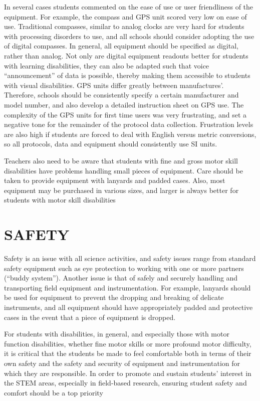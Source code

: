 \documentclass[11.5pt]{sig-alternate} %
\begin{document}
\begin{large}
In several cases students commented on the ease of use or user friendliness of the equipment. For example, the compass and GPS unit scored very low on ease of use. Traditional compasses, similar to analog clocks are very hard for students with processing disorders to use, and all schools should consider adopting the use of digital compasses. In general, all equipment should be specified as digital, rather than analog. Not only are digital equipment readouts better for students with learning disabilities, they can also be adapted such that voice “announcement” of data is possible, thereby making them accessible to students with visual disabilities. GPS units differ greatly between manufactures’. Therefore, schools should be consistently specify a certain manufacturer and model number, and also develop a detailed instruction sheet on GPS use. The complexity of the GPS units for first time users was very frustrating, and set a negative tone for the remainder of the protocol data collection. Frustration levels are also high if students are forced to deal with English versus metric conversions, so all protocols, data and equipment should consistently use SI units.

Teachers also need to be aware that students with fine and gross motor skill disabilities have problems handling small pieces of equipment. Care should be taken to provide equipment with lanyards and padded cases. Also, most equipment may be purchased in various sizes, and larger is always better for students with motor skill disabilities

\section*{SAFETY}

Safety is an issue with all science activities, and safety issues range from standard safety equipment such as eye protection to working with one or more partners (“buddy system”). Another issue is that of safely and securely handling and transporting field equipment and instrumentation. For example, lanyards should be used for equipment to prevent the dropping and breaking of delicate instruments, and all equipment should have appropriately padded and protective cases in the event that a piece of equipment is dropped.

For students with disabilities, in general, and especially those with motor function disabilities, whether fine motor skills or more profound motor difficulty, it is critical that the students be made to feel comfortable both in terms of their own safety and the safety and security of equipment and instrumentation for which they are responsible. In order to promote and sustain students’ interest in the STEM areas, especially in field-based research, ensuring student safety and comfort should be a top priority


\end{large}
\end{document}
